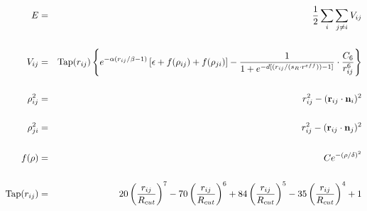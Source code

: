 \documentclass[aps,pr,onecolumn,superscriptaddress,noshowpacs,a4paper,15pt]{revtex4}
\begin{document}
%
\begingroup
\Large
\begin{eqnarray*}
  E & = & \frac{1}{2} \sum_i \sum_{j \neq i} V_{ij} \\[15pt]
  V_{ij} & = & {\rm Tap}(r_{ij})\left \{ e^{-\alpha (r_{ij}/\beta -1)} 
               \left [ \epsilon + f(\rho_{ij}) + f(\rho_{ji})\right ] - 
                \frac{1}{1+e^{-d\left [ \left ( r_{ij}/\left (s_R \cdot r^{eff} \right ) \right )-1 \right ]}}
                \cdot \frac{C_6}{r^6_{ij}} \right \}\\[15pt]
  \rho_{ij}^2 & = & r_{ij}^2 - ({\bf r}_{ij} \cdot {\bf n}_i)^2 \\[15pt]
  \rho_{ji}^2 & = & r_{ij}^2 - ({\bf r}_{ij} \cdot {\bf n}_j)^2 \\[15pt]
  f(\rho) & = &  C e^{ -( \rho / \delta )^2 }\\[15pt]
  {\rm Tap}(r_{ij}) & = & 20\left ( \frac{r_{ij}}{R_{cut}} \right )^7 -
                          70\left ( \frac{r_{ij}}{R_{cut}} \right )^6 +
                          84\left ( \frac{r_{ij}}{R_{cut}} \right )^5 -
                          35\left ( \frac{r_{ij}}{R_{cut}} \right )^4 + 1
\end{eqnarray*}
\endgroup
%
\end{document}
